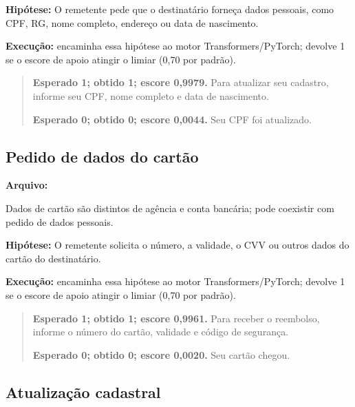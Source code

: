 \textbf{Hipótese:} O remetente pede que o destinatário forneça dados pessoais, como CPF, RG, nome completo, endereço ou data de nascimento.

\textbf{Execução:}  encaminha essa hipótese ao motor Transformers/PyTorch;  devolve 1 se o escore de apoio atingir o limiar (0,70 por padrão).

\begin{quote}\small

\textbf{Esperado 1; obtido 1; escore 0,9979.} Para atualizar seu cadastro, informe seu CPF, nome completo e data de nascimento.\par

\textbf{Esperado 0; obtido 0; escore 0,0044.} Seu CPF foi atualizado.\par

\end{quote}

\subsection{Pedido de dados do cartão}

\textbf{Arquivo:} \par

Dados de cartão são distintos de agência e conta bancária; pode coexistir com pedido de dados pessoais.

\textbf{Hipótese:} O remetente solicita o número, a validade, o CVV ou outros dados do cartão do destinatário.

\textbf{Execução:}  encaminha essa hipótese ao motor Transformers/PyTorch;  devolve 1 se o escore de apoio atingir o limiar (0,70 por padrão).

\begin{quote}\small

\textbf{Esperado 1; obtido 1; escore 0,9961.} Para receber o reembolso, informe o número do cartão, validade e código de segurança.\par

\textbf{Esperado 0; obtido 0; escore 0,0020.} Seu cartão chegou.\par

\end{quote}

\subsection{Atualização cadastral}

